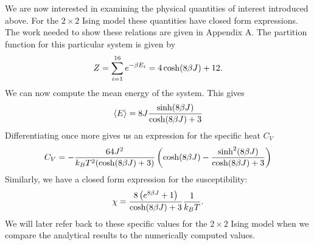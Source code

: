 We are now interested in examining the physical quantities of interest
introduced above.  For the $2\times2$ Ising model these quantities have closed
form expressions. The work needed to show these relations are given in Appendix
A. The partition function for this particular system is given by
\begin{equation}
  \notag
  Z = \sum^{16}_{i=1} e^{-\beta E_i} = 4 \cosh (8\beta J) + 12.
\end{equation}
We can now compute the mean energy of the system. This gives
\begin{equation}
  \notag
  \langle E \rangle = 8J \frac{\sinh(8\beta J)}{\cosh (8\beta J)+3}
\end{equation}
Differentiating once more gives us an expression for the specific heat $C_V$
\begin{equation}
  \notag
  C_V = -\frac{64J^2 }{k_BT^2(\cosh(8\beta J) + 3)} \left( \cosh(8\beta J) - \frac{\sinh^2(8\beta J)}{\cosh(8\beta J)+3} \right)
\end{equation}
Similarly, we have a closed form expression for the susceptibility:
\begin{equation}
  \notag
  \chi = \frac{8 \left( e^{8\beta J} + 1 \right)}{\cosh(8\beta J) + 3} \frac{1}{k_BT}.
\end{equation}
We will later refer back to these specific values for the $2\times2$ Ising
model when we compare the analytical results to the numerically computed
values.
